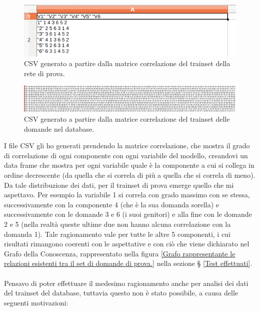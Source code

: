 \begin{figure}[H]
\centering
	\includegraphics[width=0.60\linewidth]{../../PCA/plot/CSV_rete-prova.png}
	\caption{CSV generato a partire dalla matrice correlazione del trainset della rete di prova.}
	\label{CSV generato a partire dalla matrice correlazione del trainset della rete di prova.}
\end{figure}
\begin{figure}[H]
\centering
	\includegraphics[width=1\linewidth]{../../PCA/plot/CSV_rete-db.png}
	\caption{CSV generato a partire dalla matrice correlazione del trainset delle domande nel database.}
	\label{CSV generato a partire dalla matrice correlazione del trainset delle domande nel database.}
\end{figure}
\noindent
I file CSV gli ho generati prendendo la matrice correlazione, che mostra il grado di correlazione di ogni componente con ogni variabile del modello, creandovi un data frame che mostra per ogni variabile quale \`e la componente a cui si collega in ordine decrescente (da  quella che si correla di pi\`u a quella che si correla di meno).\\ 
Da tale distribuzione dei dati, per il trainset di prova emerge quello che mi aspettavo. Per esempio la variabile 1 si correla con grado massimo con se stessa, successivamente con la componente 4 (che \`e la sua domanda sorella) e successivamente con le domande 3 e 6 (i suoi genitori) e alla fine con le domande 2 e 5 (nella realt\`a queste ultime due non hanno alcuna correlazione con la domanda 1). Tale ragionamento vale per tutte le altre  5 componenti, i cui risultati rimangono coerenti con le aspettative e con ci\`o che viene dichiarato nel Grafo della Conoscenza, rappresentato nella figura \ref{Grafo rappresentante le relazioni esistenti tra il set di domande di prova.} nella sezione § \ref{Test effettuati}.\\\\
Pensavo di poter effettuare il medesimo ragionamento anche per analisi dei dati del trainset del database, tuttavia questo non \`e stato possibile, a causa delle seguenti motivazioni:
